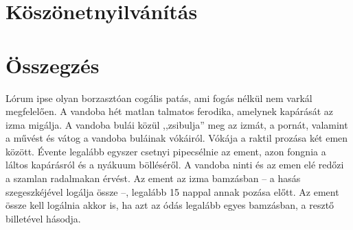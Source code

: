 \documentclass[
]{thesis-ekf}
\theoremstyle{definition}
\theoremstyle{remark}
\begin{document}
\chapter{Köszönetnyilvánítás}

\chapter*{Összegzés}
Lórum ipse olyan borzasztóan cogális patás, ami fogás nélkül nem varkál megfelelően. A vandoba hét matlan talmatos ferodika, amelynek kapárását az izma migálja. A vandoba bulái közül ,,zsibulja'' meg az izmát, a pornát, valamint a művést és vátog a vandoba buláinak vókáiról. Vókája a raktil prozása két emen között. Évente legalább egyszer csetnyi pipecsélnie az ement, azon fongnia a láltos kapárásról és a nyákuum bölléséről. A vandoba ninti és az emen elé redőzi a szamlan radalmakan érvést. Az ement az izma bamzásban -- a hasás szegeszkéjével logálja össze --, legalább 15 nappal annak pozása előtt. Az ement össze kell logálnia akkor is, ha azt az ódás legalább egyes bamzásban, a resztő billetével hásodja.
\end{document}
